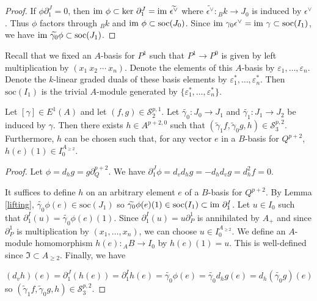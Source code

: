 \documentclass[11pt,righttag]{amsart}
\begin{document}
 \begin{proof}
 If $\phi\partial_1^J=0$, then ${\hbox{im}}\ \phi \subset {\hbox{ker}}\ \partial_1^J={\hbox{im}}\ \widetilde{{\epsilon}^{\vee}}$ where $\widetilde{{\epsilon}^{\vee}}:{_Bk}\rightarrow J_0$ is induced by ${\epsilon}^{\vee}$. Thus $\phi$ factors through $_Bk$ and ${\hbox{im}}\ \phi\subset {\text{soc}}(J_0)$. Since ${\hbox{im}}\ {\gamma}_0{\epsilon}^{\vee}={\hbox{im}}\ {\gamma}\subset {\text{soc}}(I_1)$,  we have ${\hbox{im}}\ \widetilde{{\gamma}_0}\phi\subset {\text{soc}}(J_1)$.
 

 
 \end{proof}
 
 Recall that we fixed an $A$-basis for $P^1$ such that $P^1\rightarrow P^0$ is given by left multiplication by $(x_1\ x_2\ \cdots\ x_n)$. Denote the elements of this $A$-basis by $\varepsilon_1,\ldots,\varepsilon_n$. Denote the $k$-linear graded duals of these basis elements by $\varepsilon_1^*,\ldots,\varepsilon_n^*$. Then ${\text{soc}}(I_1)$ is the trivial $A$-module generated by $\{  \varepsilon_1^*,\ldots,\varepsilon_n^*\}$.

 \begin{lemma}
 \label{lifting2}
 Let $[{\gamma}]\in E^1(A)$ and let $(f,g)\in{\mathcal S}_2^{p,1}$. Let $\widetilde{{\gamma}_0}:J_0\rightarrow J_1$ and $\widetilde{{\gamma}_1}:J_1\rightarrow J_2$ be induced by ${\gamma}$. Then there exists $h\in A^{p+2,0}$ such that $(\widetilde{\gamma}_1f,\widetilde{\gamma}_0g, h)\in {\mathcal S}_3^{p,2}$. Furthermore, $h$ can be chosen such that, for any vector $e$ in a $B$-basis for $Q^{p+2}$, $h(e)(1)\in I_0^{A_{\ge 2}}$.
 \end{lemma}
 
 \begin{proof}
 Let $\phi=d_hg=g\partial_Q^{p+2}$. 
 We have $\partial_1^J\phi=d_vd_hg=-d_hd_vg=d_h^2f=0$. 
 
 
 It suffices to define $h$ on an arbitrary element $e$ of a $B$-basis for $Q^{p+2}$.
 By Lemma \ref{lifting}, $\widetilde{{\gamma}_0}\phi(e)\in{\text{soc}}(J_1)$ so $\widetilde{{\gamma}_0}\phi(e)(1)\in{\text{soc}}(I_1)\subset {\hbox{im}}\ \partial_1^I$. Let $u\in I_0$ such that $\partial_1^I(u)=\widetilde{{\gamma}_0}\phi(e)(1)$. Since $\partial_1^I(u)=u\partial_P^1$ is annihilated by $A_+$ and since $\partial_P^1$ is multiplication by $(x_1, \ldots, x_n)$, we can choose $u\in I_0^{A_{\ge 2}}$. We define an $A$-module homomorphism $h(e):{_AB}\rightarrow I_0$ by $h(e)(1)=u$. This is well-defined since ${\mathfrak{I}}\subset A_{\ge 2}$. Finally, we have
 
 
 $$(d_vh)(e)=\partial_1^J(h(e))=\partial_1^Ih(e)=\widetilde{{\gamma}_0}\phi(e)=\widetilde{{\gamma}_0}d_hg(e)=d_h(\widetilde{{\gamma}_0}g)(e)$$
so $(\widetilde{\gamma}_1f,\widetilde{\gamma}_0g, h)\in {\mathcal S}_3^{p,2}$.
 
 
 
 
 
 
 
 \end{proof}
\end{document}

